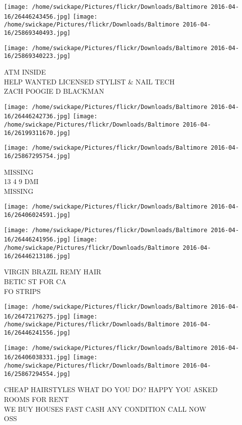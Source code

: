 \documentclass[10pt,letterpaper]{article}
\begin{document}
\texttt{[image: /home/swickape/Pictures/flickr/Downloads/Baltimore 2016-04-16/26446243456.jpg]}
\texttt{[image: /home/swickape/Pictures/flickr/Downloads/Baltimore 2016-04-16/25869340493.jpg]}

\vspace{0.25in}
\texttt{[image: /home/swickape/Pictures/flickr/Downloads/Baltimore 2016-04-16/25869340223.jpg]}

ATM INSIDE\\
HELP WANTED LICENSED STYLIST \& NAIL TECH\\
ZACH POOGIE D BLACKMAN\\
\pagebreak

\texttt{[image: /home/swickape/Pictures/flickr/Downloads/Baltimore 2016-04-16/26446242736.jpg]}
\texttt{[image: /home/swickape/Pictures/flickr/Downloads/Baltimore 2016-04-16/26199311670.jpg]}

\texttt{[image: /home/swickape/Pictures/flickr/Downloads/Baltimore 2016-04-16/25867295754.jpg]}

MISSING\\
13 4 9 DMI\\
MISSING\\
\pagebreak

\texttt{[image: /home/swickape/Pictures/flickr/Downloads/Baltimore 2016-04-16/26406024591.jpg]}

\vspace{0.25in}
\texttt{[image: /home/swickape/Pictures/flickr/Downloads/Baltimore 2016-04-16/26446241956.jpg]}
\texttt{[image: /home/swickape/Pictures/flickr/Downloads/Baltimore 2016-04-16/26446213186.jpg]}

VIRGIN BRAZIL REMY HAIR\\
BETIC ST FOR CA\\
FO STRIPS\\
\pagebreak

\texttt{[image: /home/swickape/Pictures/flickr/Downloads/Baltimore 2016-04-16/26472176275.jpg]}
\texttt{[image: /home/swickape/Pictures/flickr/Downloads/Baltimore 2016-04-16/26446241556.jpg]}

\texttt{[image: /home/swickape/Pictures/flickr/Downloads/Baltimore 2016-04-16/26406038331.jpg]}
\texttt{[image: /home/swickape/Pictures/flickr/Downloads/Baltimore 2016-04-16/25867294554.jpg]}

CHEAP HAIRSTYLES WHAT DO YOU DO? HAPPY YOU ASKED\\
ROOMS FOR RENT\\
WE BUY HOUSES FAST CASH ANY CONDITION CALL NOW\\
OSS\\
\pagebreak
\end{document}
